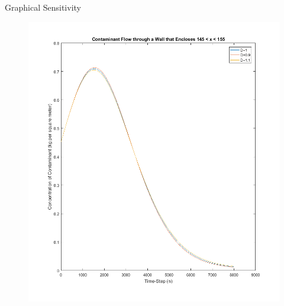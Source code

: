 \documentclass[10pt]{beamer}
\begin{document}
\begin{frame}{Graphical Sensitivity} \label{Graphical Sensitivity}

\begin{figure}   
\begin{minipage}[b]{0.496\textwidth}
   \includegraphics[trim=0mm 0mm 0mm 0mm,clip,width=1.1\linewidth]{sensepoint.png}
\begin{center}
\end{center}
\end{minipage}
 \begin{minipage}[b]{0.496\textwidth}

\end{minipage}
\end{figure}
\end{frame}
\end{document}
